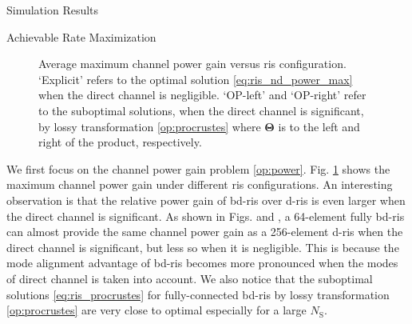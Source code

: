 \documentclass[journal]{IEEEtran}
\begin{document}
\begin{section}{Simulation Results}
	\begin{subsection}{Achievable Rate Maximization}
		\begin{figure}[!t]
			\centering
			\caption{
				Average maximum channel power gain versus \gls{ris} configuration.
				`Explicit' refers to the optimal solution \eqref{eq:ris_nd_power_max} when the direct channel is negligible.
				`OP-left' and `OP-right' refer to the suboptimal solutions, when the direct channel is significant, by lossy transformation \eqref{op:procrustes} where $\mathbf{\Theta}$ is to the left and right of the product, respectively.
			}
			\label{fg:power_sx}
		\end{figure}

		We first focus on the channel power gain problem \eqref{op:power}.
		Fig. \ref{fg:power_sx} shows the maximum channel power gain under different \gls{ris} configurations.
		An interesting observation is that the relative power gain of \gls{bd}-\gls{ris} over \gls{d}-\gls{ris} is even larger when the direct channel is significant.
		As shown in Figs.  and , a 64-element fully \gls{bd}-\gls{ris} can almost provide the same channel power gain as a 256-element \gls{d}-\gls{ris} when the direct channel is significant, but less so when it is negligible.
		This is because the mode alignment advantage of \gls{bd}-\gls{ris} becomes more pronounced when the modes of direct channel is taken into account.
		We also notice that the suboptimal solutions \eqref{eq:ris_procrustes} for fully-connected \gls{bd}-\gls{ris} by lossy transformation \eqref{op:procrustes} are very close to optimal especially for a large $N_\mathrm{S}$.


\end{subsection}
\end{section}
\end{document}
